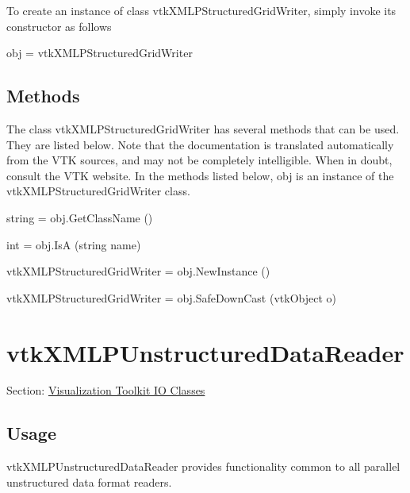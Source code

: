 To create an instance of class vtk\-X\-M\-L\-P\-Structured\-Grid\-Writer, simply invoke its constructor as follows \begin{DoxyVerb}  obj = vtkXMLPStructuredGridWriter
\end{DoxyVerb}
 \hypertarget{vtkwidgets_vtkxyplotwidget_Methods}{}\subsection{Methods}\label{vtkwidgets_vtkxyplotwidget_Methods}
The class vtk\-X\-M\-L\-P\-Structured\-Grid\-Writer has several methods that can be used. They are listed below. Note that the documentation is translated automatically from the V\-T\-K sources, and may not be completely intelligible. When in doubt, consult the V\-T\-K website. In the methods listed below, {\ttfamily obj} is an instance of the vtk\-X\-M\-L\-P\-Structured\-Grid\-Writer class. 
\begin{DoxyItemize}
\item {\ttfamily string = obj.\-Get\-Class\-Name ()}  
\item {\ttfamily int = obj.\-Is\-A (string name)}  
\item {\ttfamily vtk\-X\-M\-L\-P\-Structured\-Grid\-Writer = obj.\-New\-Instance ()}  
\item {\ttfamily vtk\-X\-M\-L\-P\-Structured\-Grid\-Writer = obj.\-Safe\-Down\-Cast (vtk\-Object o)}  
\end{DoxyItemize}\hypertarget{vtkio_vtkxmlpunstructureddatareader}{}\section{vtk\-X\-M\-L\-P\-Unstructured\-Data\-Reader}\label{vtkio_vtkxmlpunstructureddatareader}
Section\-: \hyperlink{sec_vtkio}{Visualization Toolkit I\-O Classes} \hypertarget{vtkwidgets_vtkxyplotwidget_Usage}{}\subsection{Usage}\label{vtkwidgets_vtkxyplotwidget_Usage}
vtk\-X\-M\-L\-P\-Unstructured\-Data\-Reader provides functionality common to all parallel unstructured data format readers.

